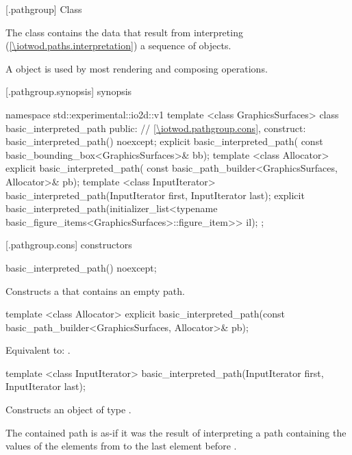  [\iotwod.pathgroup] {Class }

\pnum
{}%
The class  contains the data that result from interpreting (\ref{\iotwod.paths.interpretation}) a sequence of  objects.

\pnum
A  object is used by most rendering and composing operations.

 [\iotwod.pathgroup.synopsis] { synopsis}

\begin{codeblock}
namespace std::experimental::io2d::v1 {
  template <class GraphicsSurfaces>
  class basic_interpreted_path {
  public:
    // \ref{\iotwod.pathgroup.cons}, construct:
    basic_interpreted_path() noexcept;
    explicit basic_interpreted_path(
      const basic_bounding_box<GraphicsSurfaces>& bb);
    template <class Allocator>
    explicit basic_interpreted_path(
      const basic_path_builder<GraphicsSurfaces, Allocator>& pb);
    template <class InputIterator>
    basic_interpreted_path(InputIterator first, InputIterator last);
    explicit basic_interpreted_path(initializer_list<typename
      basic_figure_items<GraphicsSurfaces>::figure_item>> il);
  };
}
\end{codeblock}

 [\iotwod.pathgroup.cons] { constructors}

%
\begin{itemdecl}
basic_interpreted_path() noexcept;
\end{itemdecl}
\begin{itemdescr}
\pnum
\effects
Constructs a  that contains an empty path.
\end{itemdescr}

%
\begin{itemdecl}
template <class Allocator>
explicit basic_interpreted_path(const basic_path_builder<GraphicsSurfaces, Allocator>& pb);
\end{itemdecl}
\begin{itemdescr}
\pnum
\effects
Equivalent to: .	
\end{itemdescr}

%
\begin{itemdecl}
template <class InputIterator>
basic_interpreted_path(InputIterator first, InputIterator last);
\end{itemdecl}
\begin{itemdescr}
\pnum
\effects
Constructs an object of type .

\pnum
The contained path is as-if it was the result of interpreting a path containing the values of the elements from  to the last element before .
\end{itemdescr}

